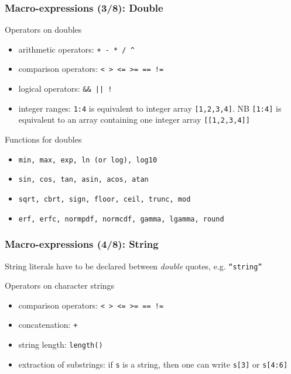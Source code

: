 \documentclass{beamer}
\begin{document}
\begin{frame}[fragile=singleslide]
  \frametitle{Macro-expressions (3/8): Double}
  \begin{block}{Operators on doubles}
    \begin{itemize}
    \item arithmetic operators: \texttt{+ - * / \^{}}
    \item comparison operators: \texttt{< > <= >= == !=}
    \item logical operators: \verb+&& || !+
    \item integer ranges: \texttt{1:4} is equivalent to integer array \texttt{[1,2,3,4]}. NB  \texttt{[1:4]} is equivalent to an array containing one integer array \texttt{[[1,2,3,4]]}
    \end{itemize}
  \end{block}

  \begin{block}{Functions for doubles}
    \begin{itemize}
    \item \texttt{min, max, exp, ln (or log), log10}
    \item \texttt{sin, cos, tan, asin, acos, atan}
    \item \texttt{sqrt, cbrt, sign, floor, ceil, trunc, mod}
    \item \texttt{erf, erfc, normpdf, normcdf, gamma, lgamma, round}
    \end{itemize}
  \end{block}
\end{frame}

\begin{frame}[fragile=singleslide]
  \frametitle{Macro-expressions (4/8): String}
  String literals have to be declared between \textit{double} quotes, e.g. \texttt{``string''}
  \begin{block}{Operators on character strings}
    \begin{itemize}
    \item comparison operators: \texttt{< > <= >= == !=}
    \item concatenation: \texttt{+}
    \item string length: \texttt{length()}
    \item extraction of substrings: if \texttt{s} is a string, then one can write \texttt{s[3]} or \texttt{s[4:6]}
    \end{itemize}
  \end{block}
\end{frame}
\end{document}
